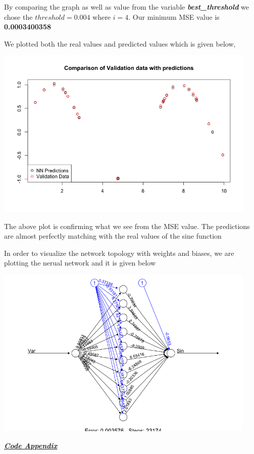 \documentclass[a4paper,10pt]{article}
\begin{document}
By comparing the graph as well as value from the variable \textbf{\textit{best\_threshold}}
we chose the $threshold = 0.004$ where $i=4$.
Our minimum MSE value is \textbf{0.0003400358} \par
We plotted both the real values and predicted values which is given below,
\begin{center}
    \includegraphics[width=125mm,scale=0.10]{NeuralNet_Predictions.png} 
  \end{center}
The above plot is confirming what we see from the MSE value. 
The predictions are almost perfectly matching with the real values of the sine function \par
In order to visualize the network topology with weights and biases, we are plotting the nerual network and it is given below
\begin{center}
  \includegraphics[width=125mm,scale=0.10]{Neural_Net_Topology.png} 
\end{center}
\newpage
\huge \textbf{\emph{\underline{Code Appendix}}} \par
\end{document}
